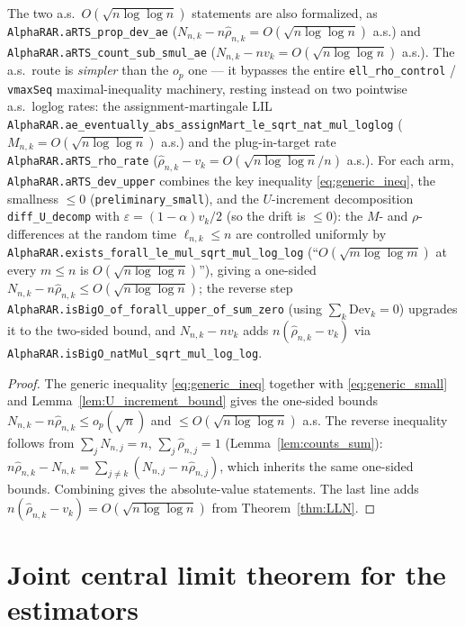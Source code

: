 \begin{lemma}
The two a.s.\ $O(\sqrt{n\log\log n})$ statements are also formalized, as
\texttt{AlphaRAR.aRTS\_prop\_dev\_ae} ($N_{n,k}-n\hat\rho_{n,k}=O(\sqrt{n\log\log n})$ a.s.) and
\texttt{AlphaRAR.aRTS\_count\_sub\_smul\_ae} ($N_{n,k}-nv_k=O(\sqrt{n\log\log n})$ a.s.). The a.s.\
route is \emph{simpler} than the $o_p$ one --- it bypasses the entire \texttt{ell\_rho\_control} /
\texttt{vmaxSeq} maximal-inequality machinery, resting instead on two pointwise a.s.\ loglog rates:
the assignment-martingale LIL
\texttt{AlphaRAR.ae\_eventually\_abs\_assignMart\_le\_sqrt\_nat\_mul\_loglog} ($M_{n,k}=O(\sqrt{n\log
\log n})$ a.s.) and the plug-in-target rate \texttt{AlphaRAR.aRTS\_rho\_rate}
($\hat\rho_{n,k}-v_k=O(\sqrt{n\log\log n}/n)$ a.s.). For each arm, \texttt{AlphaRAR.aRTS\_dev\_upper}
combines the key inequality \eqref{eq:generic_ineq}, the smallness $\le 0$
(\texttt{preliminary\_small}), and the $U$-increment decomposition \texttt{diff\_U\_decomp} with
$\varepsilon=(1-\alpha)v_k/2$ (so the drift is $\le0$): the $M$- and $\rho$-differences at the random
time $\ell_{n,k}\le n$ are controlled uniformly by
\texttt{AlphaRAR.exists\_forall\_le\_mul\_sqrt\_mul\_log\_log}
(``$O(\sqrt{m\log\log m})$ at every $m\le n$ is $O(\sqrt{n\log\log n})$''), giving a one-sided
$N_{n,k}-n\hat\rho_{n,k}\le O(\sqrt{n\log\log n})$; the reverse step
\texttt{AlphaRAR.isBigO\_of\_forall\_upper\_of\_sum\_zero} (using $\sum_k \mathrm{Dev}_k=0$) upgrades it
to the two-sided bound, and $N_{n,k}-nv_k$ adds $n(\hat\rho_{n,k}-v_k)$ via
\texttt{AlphaRAR.isBigO\_natMul\_sqrt\_mul\_log\_log}.
\end{lemma}

\begin{proof}
The generic inequality \eqref{eq:generic_ineq} together with
\eqref{eq:generic_small} and Lemma~\ref{lem:U_increment_bound} gives the one-sided
bounds $N_{n,k}-n\hat{\rho}_{n,k} \le o_p(\sqrt n)$ and $\le O(\sqrt{n\log\log n})$
a.s. The reverse inequality follows from $\sum_j N_{n,j}=n$, $\sum_j\hat{\rho}_{n,j}=1$
(Lemma~\ref{lem:counts_sum}): $n\hat{\rho}_{n,k}-N_{n,k}=\sum_{j\ne k}(N_{n,j}-n\hat{\rho}_{n,j})$,
which inherits the same one-sided bounds. Combining gives the absolute-value
statements. The last line adds $n(\hat{\rho}_{n,k}-v_k)=O(\sqrt{n\log\log n})$ from
Theorem~\ref{thm:LLN}.
\end{proof}

\section{Joint central limit theorem for the estimators}
\label{sec:norm_clt}

